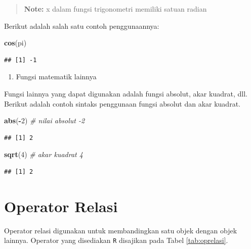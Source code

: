 \documentclass[]{book}
\newenvironment{Shaded}{\begin{snugshade}}{\end{snugshade}}
\newcommand{\KeywordTok}[1]{\textcolor[rgb]{0.13,0.29,0.53}{\textbf{#1}}}
\newcommand{\DecValTok}[1]{\textcolor[rgb]{0.00,0.00,0.81}{#1}}
\newcommand{\CommentTok}[1]{\textcolor[rgb]{0.56,0.35,0.01}{\textit{#1}}}
\newcommand{\OperatorTok}[1]{\textcolor[rgb]{0.81,0.36,0.00}{\textbf{#1}}}
\newcommand{\NormalTok}[1]{#1}
\providecommand{\tightlist}{%
  \setlength{\itemsep}{0pt}\setlength{\parskip}{0pt}}
\begin{document}
\begin{quote}
\textbf{Note: } x dalam fungsi trigonometri memiliki satuan radian
\end{quote}

Berikut adalah salah satu contoh penggunaannya:

\begin{Shaded}
\begin{Highlighting}[]
\KeywordTok{cos}\NormalTok{(pi)}
\end{Highlighting}
\end{Shaded}

\begin{verbatim}
## [1] -1
\end{verbatim}

\begin{enumerate}
\def\labelenumi{\arabic{enumi}.}
\setcounter{enumi}{2}
\tightlist
\item
  Fungsi matematik lainnya
\end{enumerate}

Fungsi lainnya yang dapat digunakan adalah fungsi absolut, akar kuadrat,
dll. Berikut adalah contoh sintaks penggunaan fungsi absolut dan akar
kuadrat.

\begin{Shaded}
\begin{Highlighting}[]
\KeywordTok{abs}\NormalTok{(}\OperatorTok{-}\DecValTok{2}\NormalTok{) }\CommentTok{# nilai absolut -2}
\end{Highlighting}
\end{Shaded}

\begin{verbatim}
## [1] 2
\end{verbatim}

\begin{Shaded}
\begin{Highlighting}[]
\KeywordTok{sqrt}\NormalTok{(}\DecValTok{4}\NormalTok{) }\CommentTok{# akar kuadrat 4}
\end{Highlighting}
\end{Shaded}

\begin{verbatim}
## [1] 2
\end{verbatim}

\section{Operator Relasi}\label{operator-relasi}

Operator relasi digunakan untuk membandingkan satu objek dengan objek
lainnya. Operator yang disediakan \texttt{R} disajikan pada Tabel
\ref{tab:oprelasi}.
\end{document}
